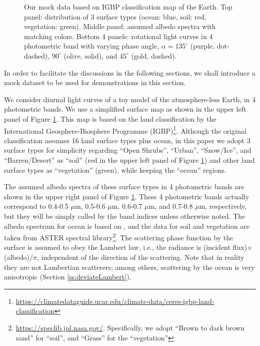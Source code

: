 \documentclass[iop,numberedappendix,apj]{emulateapj}
\def\memoJLY#1{\color{green}[JLY: {\bf #1}]\color{black}}
\begin{document}
\begin{figure}[t]
\begin{center}
    \end{center}
    \caption{Our mock data based on IGBP classification map of the Earth. Top panel: distribution of 3 surface types (ocean: blue, soil: red, vegetation: green). Middle panel: assumed albedo spectra with matching colors. Bottom 4 panels: rotational light curves in 4 photometric band with varying phase angle, $\alpha = 135^{\circ }$ (purple, dot-dashed), $90^{\circ }$ (olive, solid), and $45^{\circ }$ (gold, dashed). }
\label{fig:mockdata}
\end{figure}


In order to facilitate the discussions in the following sections, we shall introduce a mock dataset to be used for demonstrations in this section. 

We consider diurnal light curves of a toy model of the atmosphere-less Earth, in 4 photometric bands. 
We use a simplified surface map as shown in the upper left panel of Figure \ref{fig:mockdata}. 
This map is based on the land classification by the International Geosphere-Biosphere Programme (IGBP)\footnote{\url{https://climatedataguide.ucar.edu/climate-data/ceres-igbp-land-classification}}. 
Although the original classification assumes 16 land surface types plus ocean, in this paper we adopt 3 surface types for simplicity regarding ``Open Shrubs'', ``Urban'', ``Snow/Ice'', and ``Barren/Desert'' as ``soil'' (red in the upper left panel of Figure \ref{fig:mockdata}) and other land surface types as ``vegetation'' (green), while keeping the ``ocean'' regions. 


The assumed albedo spectra of these surface types in 4 photometric bands are shown in the upper right panel of Figure \ref{fig:mockdata}. 
These 4 photometric bands actually correspond to 0.4-0.5 $\mu $m, 0.5-0.6 $\mu $m, 0.6-0.7 $\mu $m, and 0.7-0.8 $\mu $m, respectively, but they will be simply called by the band indices unless otherwise noted. 
The albedo spectrum for ocean is based on \citet{Mclinden1997}, 
and the data for soil and vegetation are taken from ASTER spectral library\footnote{\url{https://speclib.jpl.nasa.gov/}. 
Specifically, we adopt  ``Brown to dark brown sand'' for ``soil'', and ``Grass'' for the ``vegetation''}. 
The scattering phase function by the surface is assumed to obey the Lambert law, i.e., the radiance is (incident flux)$\times $(albedo)/$\pi$, independent of the direction of the scattering. 
Note that in reality they are not Lambertian scatterers; among others,  scattering by the ocean is very anisotropic (Section \ref{ss:deviateLambert}).  
\end{document}
